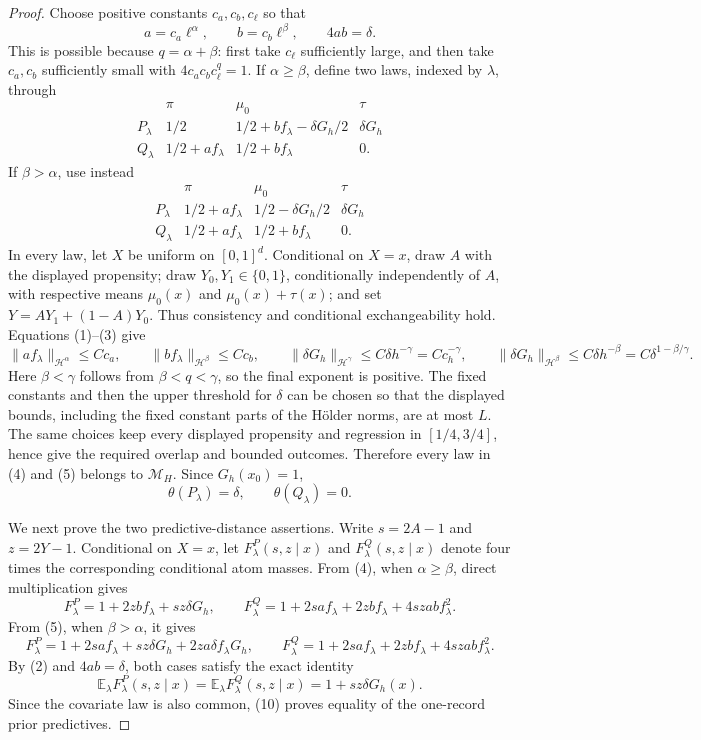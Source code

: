 \documentclass{article}
\begin{document}
\begin{proof}
Choose positive constants \(c_a,c_b,c_\ell\) so that
\[
 a=c_a\ell^\alpha,\qquad b=c_b\ell^\beta,\qquad 4ab=\delta.
 \tag{3}
\]
This is possible because \(q=\alpha+\beta\): first take \(c_\ell\) sufficiently large, and then take \(c_a,c_b\) sufficiently small with \(4c_ac_bc_\ell^q=1\).  If \(\alpha\ge\beta\), define two laws, indexed by \(\lambda\), through
\[
\begin{array}{c|ccc}
 &\pi&\mu_0&\tau\\ \hline
 P_\lambda&1/2&1/2+b f_\lambda-\delta G_h/2&\delta G_h\\
 Q_\lambda&1/2+a f_\lambda&1/2+b f_\lambda&0.
\end{array}
\tag{4}
\]
If \(\beta>\alpha\), use instead
\[
\begin{array}{c|ccc}
 &\pi&\mu_0&\tau\\ \hline
 P_\lambda&1/2+a f_\lambda&1/2-\delta G_h/2&\delta G_h\\
 Q_\lambda&1/2+a f_\lambda&1/2+b f_\lambda&0.
\end{array}
\tag{5}
\]
In every law, let \(X\) be uniform on \([0,1]^d\).  Conditional on \(X=x\), draw \(A\) with the displayed propensity; draw \(Y_0,Y_1\in\{0,1\}\), conditionally independently of \(A\), with respective means \(\mu_0(x)\) and \(\mu_0(x)+\tau(x)\); and set \(Y=AY_1+(1-A)Y_0\).  Thus consistency and conditional exchangeability hold.  Equations (1)--(3) give
\[
 \|a f_\lambda\|_{\mathcal H^\alpha}\le Cc_a,\qquad
 \|b f_\lambda\|_{\mathcal H^\beta}\le Cc_b,\qquad
 \|\delta G_h\|_{\mathcal H^\gamma}\le C\delta h^{-\gamma}=Cc_h^{-\gamma},
 \qquad
 \|\delta G_h\|_{\mathcal H^\beta}\le C\delta h^{-\beta}
 =C\delta^{1-\beta/\gamma}.
 \tag{6}
\]
Here \(\beta<\gamma\) follows from \(\beta<q<\gamma\), so the final exponent is positive.  The fixed constants and then the upper threshold for \(\delta\) can be chosen so that the displayed bounds, including the fixed constant parts of the Hölder norms, are at most \(L\).  The same choices keep every displayed propensity and regression in \([1/4,3/4]\), hence give the required overlap and bounded outcomes.  Therefore every law in (4) and (5) belongs to \(\mathcal M_H\).  Since \(G_h(x_0)=1\),
\[
 \theta(P_\lambda)=\delta,\qquad \theta(Q_\lambda)=0.
 \tag{7}
\]

We next prove the two predictive-distance assertions.  Write \(s=2A-1\) and \(z=2Y-1\).  Conditional on \(X=x\), let \(F^P_\lambda(s,z\mid x)\) and \(F^Q_\lambda(s,z\mid x)\) denote four times the corresponding conditional atom masses.  From (4), when \(\alpha\ge\beta\), direct multiplication gives
\[
 F^P_\lambda=1+2zb f_\lambda+sz\delta G_h,
 \qquad
 F^Q_\lambda=1+2sa f_\lambda+2zb f_\lambda+4szab f_\lambda^2.
 \tag{8}
\]
From (5), when \(\beta>\alpha\), it gives
\[
 F^P_\lambda=1+2sa f_\lambda+sz\delta G_h+2za\delta f_\lambda G_h,
 \qquad
 F^Q_\lambda=1+2sa f_\lambda+2zb f_\lambda+4szab f_\lambda^2.
 \tag{9}
\]
By (2) and \(4ab=\delta\), both cases satisfy the exact identity
\[
 \mathbb E_\lambda F^P_\lambda(s,z\mid x)
 =\mathbb E_\lambda F^Q_\lambda(s,z\mid x)
 =1+sz\delta G_h(x).
 \tag{10}
\]
Since the covariate law is also common, (10) proves equality of the one-record prior predictives.


\end{proof}
\end{document}

